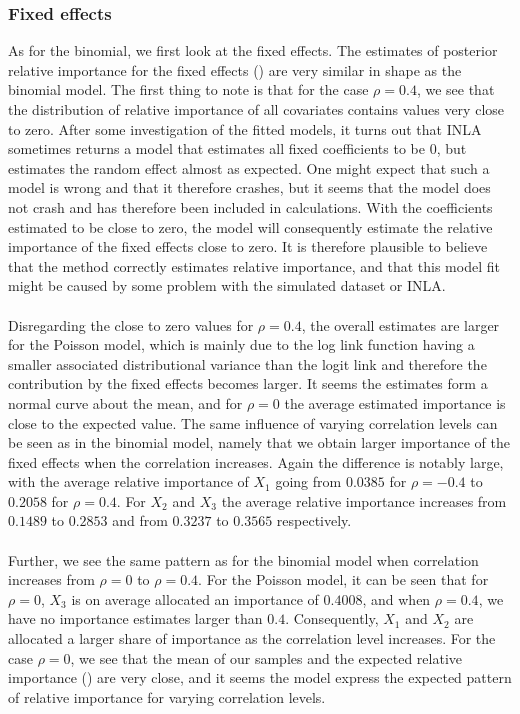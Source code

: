 \subsubsection{Fixed effects}
As for the binomial, we first look at the fixed effects. The estimates of posterior relative importance for the fixed effects () are very similar in shape as the binomial model. The first thing to note is that for the case $\rho=0.4$, we see that the distribution of relative importance of all covariates contains values very close to zero. After some investigation of the fitted models, it turns out that INLA sometimes returns a model that estimates all fixed coefficients to be $0$, but estimates the random effect almost as expected. One might expect that such a model is wrong and that it therefore crashes, but it seems that the model does not crash and has therefore been included in calculations. With the coefficients estimated to be close to zero, the model will consequently estimate the relative importance of the fixed effects close to zero. It is therefore plausible to believe that the method correctly estimates relative importance, and that this model fit might be caused by some problem with the simulated dataset or INLA.
\\
\\
Disregarding the close to zero values for $\rho=0.4$, the overall estimates are larger for the Poisson model, which is mainly due to the log link function having a smaller associated distributional variance than the logit link and therefore the contribution by the fixed effects becomes larger. It seems the estimates form a normal curve about the mean, and for $\rho=0$ the average estimated importance is close to the expected value. The same influence of varying correlation levels can be seen as in the binomial model, namely that we obtain larger importance of the fixed effects when the correlation increases. Again the difference is notably large, with the average relative importance of $X_1$ going from $0.0385$ for $\rho=-0.4$ to $0.2058$ for $\rho=0.4$. For $X_2$ and $X_3$ the average relative importance increases from $0.1489$ to $0.2853$ and from $0.3237$ to $0.3565$ respectively.
\\
\\
Further, we see the same pattern as for the binomial model when correlation increases from $\rho=0$ to $\rho=0.4$. For the Poisson model, it can be seen that for $\rho=0$, $X_3$ is on average allocated an importance of $0.4008$, and when $\rho=0.4$, we have no importance estimates larger than $0.4$. Consequently, $X_1$ and $X_2$ are allocated a larger share of importance as the correlation level increases. For the case $\rho=0$, we see that the mean of our samples and the expected relative importance () are very close, and it seems the model express the expected pattern of relative importance for varying correlation levels.
